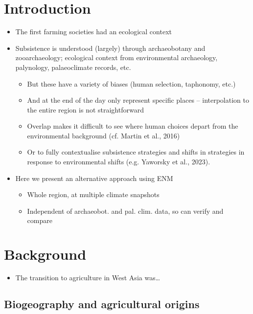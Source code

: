 \documentclass[
  number,
  review]{elsarticle}
\providecommand{\tightlist}{%
  \setlength{\itemsep}{0pt}\setlength{\parskip}{0pt}}\usepackage{longtable,booktabs,array}
\begin{document}
\section{Introduction}\label{introduction}

\begin{itemize}
\tightlist
\item
  The first farming societies had an ecological context
\item
  Subsistence is understood (largely) through archaeobotany and
  zooarchaeology; ecological context from environmental archaeology,
  palynology, palaeoclimate records, etc.

  \begin{itemize}
  \tightlist
  \item
    But these have a variety of biases (human selection, taphonomy,
    etc.)
  \item
    And at the end of the day only represent specific places --
    interpolation to the entire region is not straightforward
  \item
    Overlap makes it difficult to see where human choices depart from
    the environmental background (cf. Martin et al., 2016)
  \item
    Or to fully contextualise subsistence strategies and shifts in
    strategies in response to environmental shifts (e.g. Yaworsky et
    al., 2023).
  \end{itemize}
\item
  Here we present an alternative approach using ENM

  \begin{itemize}
  \tightlist
  \item
    Whole region, at multiple climate snapshots
  \item
    Independent of archaeobot. and pal. clim. data, so can verify and
    compare
  \end{itemize}
\end{itemize}

\section{Background}\label{background}

\begin{itemize}
\tightlist
\item
  The transition to agriculture in West Asia was\ldots{}
\end{itemize}

\subsection{Biogeography and agricultural
origins}\label{biogeography-and-agricultural-origins}
\end{document}
